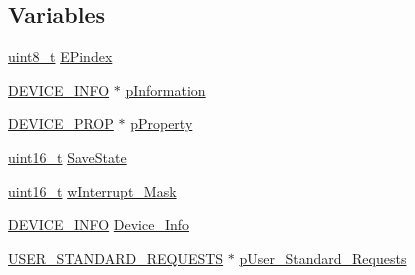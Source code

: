 \subsection*{Variables}
\begin{DoxyCompactItemize}
\item 
\hyperlink{stdint_8h_aba7bc1797add20fe3efdf37ced1182c5}{uint8\-\_\-t} \hyperlink{_s_t_m32_f10x_2_libraries_2_s_t_m32___u_s_b-_f_s-_device___driver_2src_2usb__init_8c_a227b4da72d62002d4c00ea5e82ba83c9}{E\-Pindex}
\item 
\hyperlink{_s_t_m32_f10x_2_libraries_2_s_t_m32___u_s_b-_f_s-_device___driver_2inc_2usb__core_8h_a6c959d0e0181f5f4b6a8b6b3f8e16760}{D\-E\-V\-I\-C\-E\-\_\-\-I\-N\-F\-O} $\ast$ \hyperlink{_s_t_m32_f10x_2_libraries_2_s_t_m32___u_s_b-_f_s-_device___driver_2src_2usb__init_8c_aee2c852e2abf0858434a286864925289}{p\-Information}
\item 
\hyperlink{_s_t_m32_f10x_2_libraries_2_s_t_m32___u_s_b-_f_s-_device___driver_2inc_2usb__core_8h_a90353becd4185446508b796a7f39fbce}{D\-E\-V\-I\-C\-E\-\_\-\-P\-R\-O\-P} $\ast$ \hyperlink{_s_t_m32_f10x_2_libraries_2_s_t_m32___u_s_b-_f_s-_device___driver_2src_2usb__init_8c_a097ddc79931f5731f55b4c7d4874ea7e}{p\-Property}
\item 
\hyperlink{stdint_8h_a273cf69d639a59973b6019625df33e30}{uint16\-\_\-t} \hyperlink{_s_t_m32_f10x_2_libraries_2_s_t_m32___u_s_b-_f_s-_device___driver_2src_2usb__init_8c_af8f4742d656fff9ee1db1ef79a53150a}{Save\-State}
\item 
\hyperlink{stdint_8h_a273cf69d639a59973b6019625df33e30}{uint16\-\_\-t} \hyperlink{_s_t_m32_f10x_2_libraries_2_s_t_m32___u_s_b-_f_s-_device___driver_2src_2usb__init_8c_a6304592c11373c53999f23226cb5e5d7}{w\-Interrupt\-\_\-\-Mask}
\item 
\hyperlink{_s_t_m32_f10x_2_libraries_2_s_t_m32___u_s_b-_f_s-_device___driver_2inc_2usb__core_8h_a6c959d0e0181f5f4b6a8b6b3f8e16760}{D\-E\-V\-I\-C\-E\-\_\-\-I\-N\-F\-O} \hyperlink{_s_t_m32_f10x_2_libraries_2_s_t_m32___u_s_b-_f_s-_device___driver_2src_2usb__init_8c_aafdb1c0ee02432099324e826f25d0844}{Device\-\_\-\-Info}
\item 
\hyperlink{_s_t_m32_f10x_2_libraries_2_s_t_m32___u_s_b-_f_s-_device___driver_2inc_2usb__core_8h_abf9887b82ae511cfb155d0d97c9a7c1a}{U\-S\-E\-R\-\_\-\-S\-T\-A\-N\-D\-A\-R\-D\-\_\-\-R\-E\-Q\-U\-E\-S\-T\-S} $\ast$ \hyperlink{_s_t_m32_f10x_2_libraries_2_s_t_m32___u_s_b-_f_s-_device___driver_2src_2usb__init_8c_a54cd36264ecd2640f1812a61a6d66bfb}{p\-User\-\_\-\-Standard\-\_\-\-Requests}
\end{DoxyCompactItemize}


